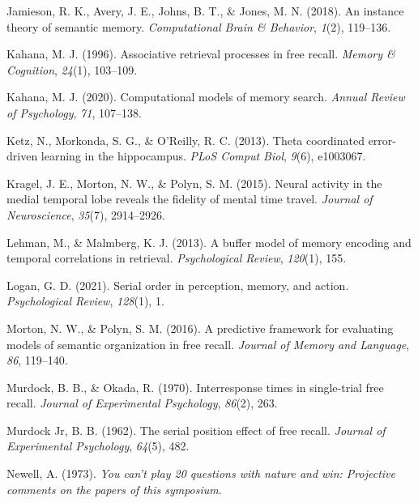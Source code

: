 \documentclass[
  letterpaper,
  DIV=11]{article}
\newlength{\cslhangindent}
\newlength{\cslentryspacingunit} %
\newenvironment{CSLReferences}[2] %
 {%
  \setlength{\parindent}{0pt}
  \ifodd #1
  \let\oldpar\par
  \def\par{\hangindent=\cslhangindent\oldpar}
  \fi
  \setlength{\parskip}{#2\cslentryspacingunit}
 }%
 {}
\begin{document}
\begin{CSLReferences}{1}{0}
\leavevmode{}%
Jamieson, R. K., Avery, J. E., Johns, B. T., \& Jones, M. N. (2018). An
instance theory of semantic memory. \emph{Computational Brain \&
Behavior}, \emph{1}(2), 119--136.

\leavevmode{}%
Kahana, M. J. (1996). Associative retrieval processes in free recall.
\emph{Memory \& Cognition}, \emph{24}(1), 103--109.

\leavevmode{}%
Kahana, M. J. (2020). Computational models of memory search.
\emph{Annual Review of Psychology}, \emph{71}, 107--138.

\leavevmode{}%
Ketz, N., Morkonda, S. G., \& O'Reilly, R. C. (2013). Theta coordinated
error-driven learning in the hippocampus. \emph{PLoS Comput Biol},
\emph{9}(6), e1003067.

\leavevmode{}%
Kragel, J. E., Morton, N. W., \& Polyn, S. M. (2015). Neural activity in
the medial temporal lobe reveals the fidelity of mental time travel.
\emph{Journal of Neuroscience}, \emph{35}(7), 2914--2926.

\leavevmode{}%
Lehman, M., \& Malmberg, K. J. (2013). A buffer model of memory encoding
and temporal correlations in retrieval. \emph{Psychological Review},
\emph{120}(1), 155.

\leavevmode{}%
Logan, G. D. (2021). Serial order in perception, memory, and action.
\emph{Psychological Review}, \emph{128}(1), 1.

\leavevmode{}%
Morton, N. W., \& Polyn, S. M. (2016). A predictive framework for
evaluating models of semantic organization in free recall. \emph{Journal
of Memory and Language}, \emph{86}, 119--140.

\leavevmode{}%
Murdock, B. B., \& Okada, R. (1970). Interresponse times in single-trial
free recall. \emph{Journal of Experimental Psychology}, \emph{86}(2),
263.

\leavevmode{}%
Murdock Jr, B. B. (1962). The serial position effect of free recall.
\emph{Journal of Experimental Psychology}, \emph{64}(5), 482.

\leavevmode{}%
Newell, A. (1973). \emph{You can't play 20 questions with nature and
win: Projective comments on the papers of this symposium}.


\end{CSLReferences}
\end{document}
